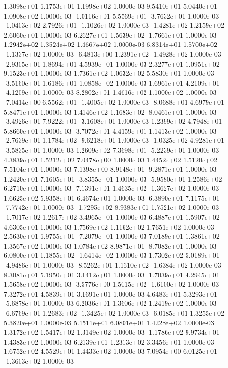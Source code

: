 1.3098e+01 6.1753e+01 1.1998e+02  1.0000e-03
9.5410e+01 5.0440e+01 1.0908e+02  1.0000e-03
-1.0116e+01  5.5569e+01 -3.7632e+01  1.0000e-03
-1.0403e+02  2.7926e+01 -1.1026e+02  1.0000e-03
-1.4281e+02  1.2159e+02  2.6060e+01  1.0000e-03
 6.2627e+01  1.5639e+02 -1.7661e+01  1.0000e-03
1.2942e+02 1.3524e+02 1.4667e+02  1.0000e-03
 6.8314e+01  1.5700e+02 -1.1337e+02  1.0000e-03
-6.4813e+00  1.2391e+02 -1.4928e+02  1.0000e-03
-2.9305e+01  1.8694e+01  4.5939e+01  1.0000e-03
2.3277e+01 1.0951e+02 9.1523e+01  1.0000e-03
1.7361e+02 1.0632e+02 5.5830e+01  1.0000e-03
-3.5160e+01  1.6186e+01  1.0858e+02  1.0000e-03
 1.6961e+01  4.2109e+01 -4.1209e+01  1.0000e-03
8.2802e+01 1.4616e+02 1.1000e+02  1.0000e-03
-7.0414e+00  6.5562e+01 -1.4005e+02  1.0000e-03
-8.0688e+01  4.6979e+01  5.8471e+01  1.0000e-03
 1.4146e+02  1.1683e+02 -8.0461e+01  1.0000e-03
-3.4926e+01  7.9222e+01 -3.1608e+01  1.0000e-03
1.2399e+02 4.7948e+01 5.8660e+01  1.0000e-03
-3.7072e+01  4.4159e+01  1.1413e+02  1.0000e-03
-2.7639e+01  1.1784e+02 -9.6218e+01  1.0000e-03
-1.0325e+02  4.9281e+01 -3.5835e+01  1.0000e-03
 1.2609e+02  7.3698e+01 -5.2239e+01  1.0000e-03
4.3839e+01 1.5212e+02 7.0478e+00  1.0000e-03
1.4452e+02 1.5120e+02 7.5104e+01  1.0000e-03
 7.1398e+00  8.9148e+01 -9.2871e+01  1.0000e-03
 1.2420e+01  7.1605e+01 -3.8355e+01  1.0000e-03
-5.9580e+01  1.2586e+02  6.2710e+01  1.0000e-03
-7.1391e+01  1.4635e+02 -1.3627e+02  1.0000e-03
1.6625e+02 5.9358e+01 6.4674e+01  1.0000e-03
-6.3890e+01  7.1175e+01 -7.7742e+01  1.0000e-03
-1.7295e+02  8.9383e+01  1.7521e+02  1.0000e-03
-1.7017e+02  1.2617e+02  3.4965e+01  1.0000e-03
6.4887e+01 1.5907e+02 4.6305e+01  1.0000e-03
1.7569e+02 1.1162e+02 1.7651e+02  1.0000e-03
 2.5630e+01  6.9755e+01 -7.2079e+01  1.0000e-03
7.0189e+01 1.3861e+02 1.3567e+02  1.0000e-03
 1.0784e+02  8.9871e+01 -8.7082e+01  1.0000e-03
 6.0800e+01  1.1855e+02 -1.6414e+02  1.0000e-03
 1.7302e+02  5.0189e+01 -4.9486e+01  1.0000e-03
-8.5262e+01  1.1610e+02 -1.6384e+02  1.0000e-03
8.3081e+01 5.1950e+01 3.1412e+01  1.0000e-03
-1.7039e+01  4.2945e+01  1.5658e+02  1.0000e-03
-3.5776e+00  1.5015e+02 -1.6100e+02  1.0000e-03
7.3272e+01 4.5839e+01 3.1691e+01  1.0000e-03
 4.6483e+01  5.3293e+01 -5.6878e+01  1.0000e-03
6.2036e+01 1.3606e+02 1.2419e+02  1.0000e-03
-6.6769e+01  1.2683e+02 -1.3425e+02  1.0000e-03
-6.0185e+01  1.3255e+02  5.3820e+01  1.0000e-03
5.1511e+01 6.0801e+01 1.4228e+02  1.0000e-03
1.3172e+02 1.5417e+02 1.3149e+02  1.0000e-03
-1.1786e+02  9.9734e+01  1.4383e+02  1.0000e-03
6.2139e+01 1.2313e+02 3.3456e+01  1.0000e-03
1.6752e+02 4.5529e+01 1.4433e+02  1.0000e-03
 7.0954e+00  6.0125e+01 -1.3603e+02  1.0000e-03
